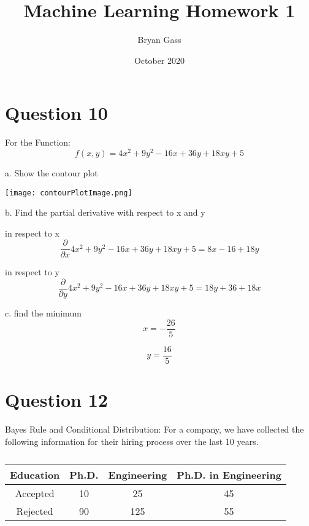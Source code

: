 \documentclass{article}
\title{Machine Learning Homework 1}
\author{Bryan Gass}
\date{October 2020}
\begin{document}
\maketitle

\section{Question 10}
For the Function:
\begin{equation}
f(x,y) = 4x^{2}+9y^{2}-16x+36y+18xy+5
\end{equation}

a. Show the contour plot
\begin{center}
\texttt{[image: contourPlotImage.png]}
\end{center}

b. Find the partial derivative with respect to x and y

in respect to x
\begin{equation}
\frac{\partial}{\partial x} 4x^{2}+9y^{2}-16x+36y+18xy+5 = 8x-16+18y
\end{equation}

in respect to y
\begin{equation}
\frac{\partial}{\partial y} 4x^{2}+9y^{2}-16x+36y+18xy+5 = 18y+36+18x
\end{equation}

c. find the minimum
\begin{equation}
x = -\frac{26}{5}
\end{equation}

\begin{equation}
y = \frac{16}{5}
\end{equation}

\section{Question 12}
Bayes Rule and Conditional Distribution:
For a company, we have collected the following information for their hiring process over the
last 10 years.

\begin{table}[h!]
\centering
\caption{}
\begin{tabular}{c||c|c|c}
\hline
Education & Ph.D. & Engineering & Ph.D. in Engineering \\
\hline
Accepted & 10 & 25 & 45 \\
\hline
Rejected & 90 & 125 & 55 \\
\hline
\end{tabular}
\label{table:1}
\end{table}
\end{document}
